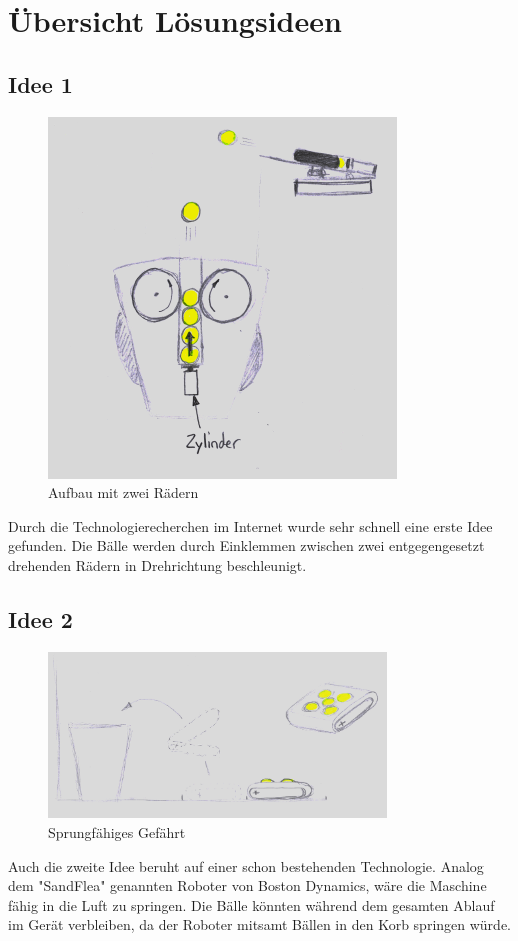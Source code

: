 \clearpage
\section{Übersicht Lösungsideen}
\subsection{Idee 1}
\begin{figure}[h!]
	\centering
	\includegraphics[scale=0.75]{../../fig/Wurfmaschine_Drehraeder.png}
	\caption{Aufbau mit zwei Rädern}
	\label{fig:konzept1}
\end{figure}
Durch die Technologierecherchen im Internet wurde sehr schnell eine erste Idee gefunden. Die Bälle werden durch Einklemmen zwischen zwei entgegengesetzt drehenden Rädern in Drehrichtung beschleunigt.

\subsection{Idee 2}
\begin{figure}[h!]
	\centering
	\includegraphics[width=0.8\textwidth]{../../fig/Springer.jpg}
	\caption{Sprungfähiges Gefährt}
	\label{fig:springer}
\end{figure}
Auch die zweite Idee beruht auf einer schon bestehenden Technologie. Analog dem "SandFlea" genannten Roboter von Boston Dynamics, wäre die Maschine fähig in die Luft zu springen. Die Bälle könnten während dem gesamten Ablauf im Gerät verbleiben, da der Roboter mitsamt Bällen in den Korb springen würde.

